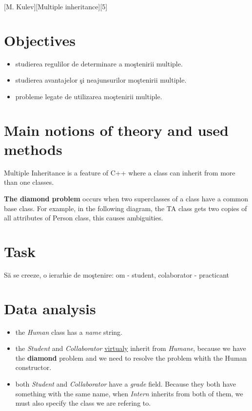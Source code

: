 \documentclass{article}
\begin{document}
	\def \reportSubj{Multiple inheritance}
	[M. Kulev][\reportSubj][5]

	\section{Objectives}
		\begin{itemize}
			\item studierea regulilor de determinare a moştenirii multiple.
			\item studierea avantajelor şi neajunsurilor moştenirii multiple.
			\item probleme legate de utilizarea moştenirii multiple.
		\end{itemize}

	\section{Main notions of theory and used methods}
		\par Multiple Inheritance is a feature of C++ where a class can inherit from more than one classes.

		\par \textbf{The diamond problem} occurs when two superclasses of a class have a common base class. For example, in the following diagram, the TA class gets two copies of all attributes of Person class, this causes ambiguities.

	\section{Task}
		Să se creeze, o ierarhie de moştenire: om - student, colaborator - practicant

	\section{Data analysis}
		\begin{itemize}
			\item the \textit{Human} class has a \textit{name} string.

			\item the \textit{Student} and \textit{Collaborator} \underline{virtualy} inherit from \textit{Humane}, because we have the \textbf{diamond} problem and we need to resolve the problem whith the Human constructor.

			\item both \textit{Student} and \textit{Collaborator} have a \textit{grade} field. Because they both have something with the same name, when \textit{Intern} inherits from both of them, we must also specify the class we are refering to.
		\end{itemize}
\end{document}
